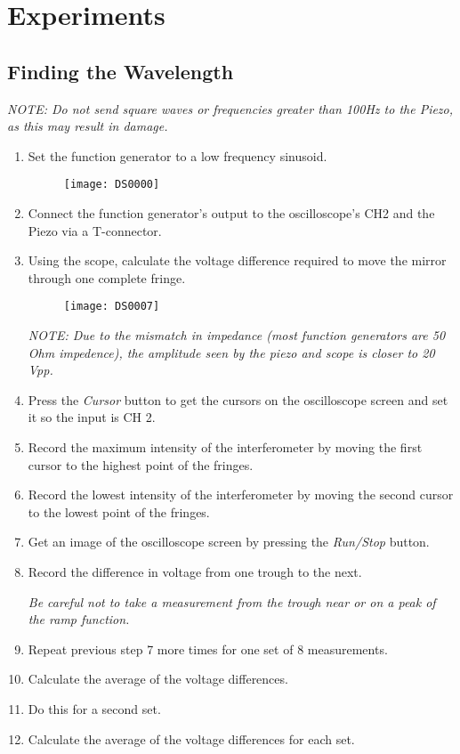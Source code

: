 
\section{Experiments}
	\subsection{Finding the Wavelength}

\emph{NOTE: Do not send square waves or frequencies greater than 100Hz
to the Piezo, as this may result in damage.}

\begin{enumerate}
 	\item Set the function generator to a low frequency sinusoid.
		\begin{figure}[ht!]
		\centering
		\texttt{[image: DS0000]}
		\end{figure}
	\item Connect the function generator's output to the oscilloscope's CH2
        and the Piezo via a T-connector.
	\item Using the scope, calculate the voltage difference required
		  to move the mirror through one complete fringe.
		\begin{figure}[ht!]
		\centering
		\texttt{[image: DS0007]}
		\end{figure}

	\emph{NOTE: Due to the mismatch in impedance (most function generators
		are 50 Ohm impedence), the amplitude seen by the piezo and scope is closer to 20 Vpp.}
	
	\item Press the \emph{Cursor} button to get the cursors on the oscilloscope screen and set it so the input is CH 2.
	\item Record the maximum intensity of the interferometer by moving the first cursor to the highest point of the fringes.
	\item Record the lowest intensity of the interferometer by moving the second cursor to the lowest point of the fringes.
	\item Get an image of the oscilloscope screen by pressing the \emph{Run/Stop} button. 
	\item Record the difference in voltage from one trough to the next. 
	
	\emph{Be careful not to take a measurement from the trough near or on a peak of the ramp function.}
	
	\item Repeat previous step 7 more times for one set of 8 measurements. 
	\item Calculate the average of the voltage differences.
	\item Do this for a second set.
	\item Calculate the average of the voltage differences for each set.
\end{enumerate}



